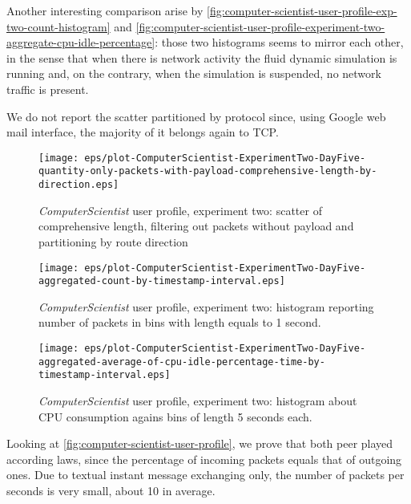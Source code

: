 \documentclass[10pt,a4paper]{article}
\begin{document}
    Another interesting comparison arise by
    \autoref{fig:computer-scientist-user-profile-exp-two-count-histogram}
    and
    \autoref{fig:computer-scientist-user-profile-experiment-two-aggregate-cpu-idle-percentage}:
    those two histograms seems to mirror each other, in the sense that
    when there is network activity the fluid dynamic simulation is
    running and, on the contrary, when the simulation is suspended, no
    network traffic is present.

    We do not report the scatter partitioned by protocol since, using
    Google web mail interface, the majority of it belongs again to
    TCP.




    \begin{figure}
      \centering
      \texttt{[image: eps/plot-ComputerScientist-ExperimentTwo-DayFive-quantity-only-packets-with-payload-comprehensive-length-by-direction.eps]}
      \caption{\emph{ComputerScientist} user profile, experiment two:
        scatter of comprehensive length, filtering out packets without
        payload and partitioning by route direction}
      \label{fig:computer-scientist-user-profile-experiment-two-comprehensive-length-scatter-filtering-on-payload-partitioned-by-direction}
    \end{figure}

    \begin{figure}
      \centering
      \texttt{[image: eps/plot-ComputerScientist-ExperimentTwo-DayFive-aggregated-count-by-timestamp-interval.eps]}
      \caption{\emph{ComputerScientist} user profile, experiment two: histogram
        reporting number of packets in bins with length equals to 1
        second.}
      \label{fig:computer-scientist-user-profile-exp-two-count-histogram}
    \end{figure}

    \begin{figure}
      \centering
      \texttt{[image: eps/plot-ComputerScientist-ExperimentTwo-DayFive-aggregated-average-of-cpu-idle-percentage-time-by-timestamp-interval.eps]}
      \caption{\emph{ComputerScientist} user profile, experiment two:
        histogram about CPU consumption agains bins of length 5
        seconds each.}
      \label{fig:computer-scientist-user-profile-experiment-two-aggregate-cpu-idle-percentage}
    \end{figure}

    Looking at \autoref{fig:computer-scientist-user-profile}, we prove
    that both peer played according laws, since the percentage of
    incoming packets equals that of outgoing ones. Due to textual
    instant message exchanging only, the number of packets per seconds
    is very small, about 10 in average.
\end{document}
